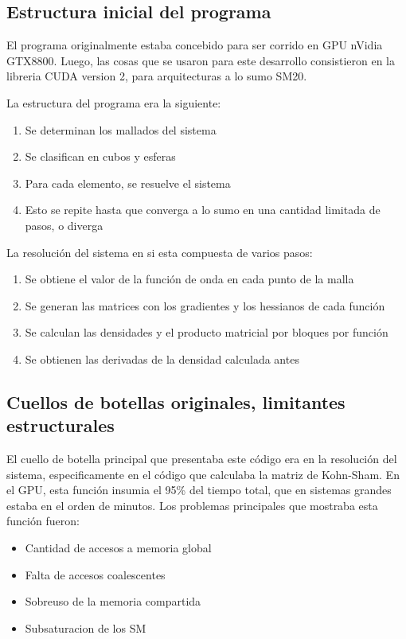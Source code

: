 \subsection{Estructura inicial del programa}

El programa originalmente estaba concebido para ser corrido en GPU nVidia GTX8800.
Luego, las cosas que se usaron para este desarrollo consistieron en la libreria CUDA version
2, para arquitecturas a lo sumo SM20.

La estructura del programa era la siguiente:
\begin{enumerate}
\item Se determinan los mallados del sistema
\item Se clasifican en cubos y esferas
\item Para cada elemento, se resuelve el sistema
\item Esto se repite hasta que converga a lo sumo en una cantidad limitada de pasos, o diverga
\end{enumerate}

La resoluci\'on del sistema en si esta compuesta de varios pasos:
\begin{enumerate}
\item Se obtiene el valor de la funci\'on de onda en cada punto de la malla
\item Se generan las matrices con los gradientes y los hessianos de cada funci\'on
\item Se calculan las densidades y el producto matricial por bloques por funci\'on
\item Se obtienen las derivadas de la densidad calculada antes
\end{enumerate}


\subsection{Cuellos de botellas originales, limitantes estructurales}

El cuello de botella principal que presentaba este c\'odigo era en la
resoluci\'on del sistema, especificamente en el c\'odigo que calculaba la matriz de Kohn-Sham.
En el GPU, esta funci\'on insumia el 95\% del tiempo total, que en sistemas grandes estaba
en el orden de minutos. Los problemas principales que mostraba esta funci\'on fueron:
\begin{itemize}
\item Cantidad de accesos a memoria global
\item Falta de accesos coalescentes
\item Sobreuso de la memoria compartida
\item Subsaturacion de los SM
\end{itemize}

